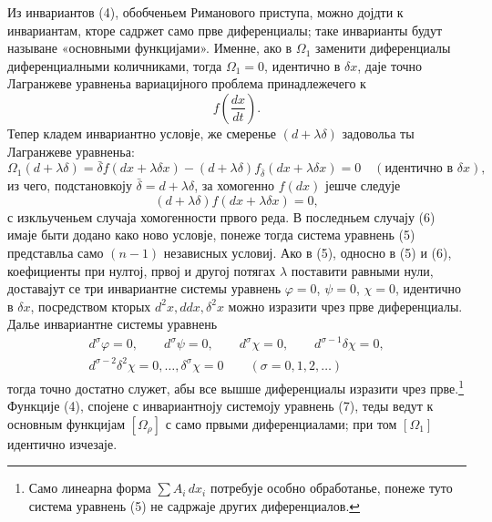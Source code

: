 ﻿\documentclass[11pt]{article}
\providecommand{\bdelta}{\bar{\delta}}
\begin{document}
Из инвариантов (4), обобченьем Риманового приступа, можно дојдти к инвариантам, кторе садржет само прве диференциалы; таке инварианты будут называне «основными функцијами». Именне, ако в \(\Omega_1\) заменити диференциалы диференциалными количниками, тогда \(\Omega_1=0\), идентично в \(\delta x\), даје точно Лагранжеве уравненьа вариацијного проблема принадлежечего к
\[
f\!\left(\frac{dx}{dt}\right).
\]
Тепер кладем инвариантно условје, же смеренье \((d+\lambda\delta)\) задовольа ты Лагранжеве уравненьа:
\begin{equation}
\Omega_1(d+\lambda\delta)=
\bdelta f(dx+\lambda\delta x)
-(d+\lambda\delta)f_{\bdelta}(dx+\lambda\delta x)=0
\quad(\text{идентично в }\delta x),
\tag{5}
\end{equation}
из чего, подстановкоју \(\bdelta=d+\lambda\delta\), за хомогенно \(f(dx)\) јешче следује
\begin{equation}
(d+\lambda\delta)f(dx+\lambda\delta x)=0,
\tag{6}
\end{equation}
с изкльученьем случаја хомогенности првого реда. В последньем случају (6) имаје быти додано како ново условје, понеже тогда система уравнень (5) представльа само \((n-1)\) независных условиј. Ако в (5), односно в (5) и (6), коефициенты при нултој, првој и другој потягах \(\lambda\) поставити равными нули, доставајут се три инвариантне системы уравнень
\(\varphi=0\), \(\psi=0\), \(\chi=0\), идентично в \(\delta x\), посредством кторых \(d^2x,ddx,\delta^2x\) можно изразити чрез прве диференциалы. Далье инвариантне системы уравнень
\begin{equation}
\begin{gathered}
d^\sigma\varphi=0,\qquad d^\sigma\psi=0,\qquad
d^\sigma\chi=0,\qquad d^{\sigma-1}\delta\chi=0,\\
d^{\sigma-2}\delta^2\chi=0,\ldots,\delta^\sigma\chi=0
\qquad(\sigma=0,1,2,\ldots)
\end{gathered}
\tag{7}
\end{equation}
тогда точно достатно служет, абы все вышше диференциалы изразити чрез прве.\footnote{Само линеарна форма \(\sum A_i\,dx_i\) потребује особно обработанье, понеже туто система уравнень (5) не садржаје других диференциалов.} Функције (4), спојене с инвариантноју системоју уравнень (7), теды ведут к основным функцијам \([\Omega_\rho]\) с само првыми диференциалами; при том \([\Omega_1]\) идентично изчезаје.
\end{document}
